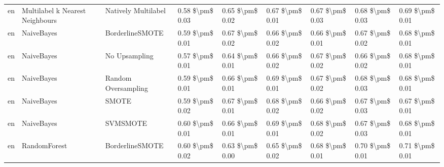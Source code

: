 \begin{tabular}{lllllllll}
      en & Multilabel k Nearest Neighbours &           Natively Multilabel & 0.58 \$\textbackslash pm\$ 0.03 &           0.65 \$\textbackslash pm\$ 0.02 &       0.67 \$\textbackslash pm\$ 0.01 &        0.67 \$\textbackslash pm\$ 0.03 &                         0.68 \$\textbackslash pm\$ 0.03 &     0.69 \$\textbackslash pm\$ 0.01 \\
      en &                      NaiveBayes &               BorderlineSMOTE & 0.59 \$\textbackslash pm\$ 0.01 &           0.67 \$\textbackslash pm\$ 0.02 &       0.66 \$\textbackslash pm\$ 0.02 &        0.66 \$\textbackslash pm\$ 0.01 &                         0.67 \$\textbackslash pm\$ 0.02 &     0.68 \$\textbackslash pm\$ 0.01 \\
      en &                      NaiveBayes &                 No Upsampling & 0.57 \$\textbackslash pm\$ 0.01 &           0.64 \$\textbackslash pm\$ 0.01 &       0.66 \$\textbackslash pm\$ 0.02 &        0.67 \$\textbackslash pm\$ 0.02 &                         0.66 \$\textbackslash pm\$ 0.02 &     0.68 \$\textbackslash pm\$ 0.01 \\
      en &                      NaiveBayes &           Random Oversampling & 0.59 \$\textbackslash pm\$ 0.01 &           0.66 \$\textbackslash pm\$ 0.01 &       0.69 \$\textbackslash pm\$ 0.01 &        0.67 \$\textbackslash pm\$ 0.02 &                         0.68 \$\textbackslash pm\$ 0.03 &     0.68 \$\textbackslash pm\$ 0.01 \\
      en &                      NaiveBayes &                         SMOTE & 0.59 \$\textbackslash pm\$ 0.02 &           0.67 \$\textbackslash pm\$ 0.01 &       0.68 \$\textbackslash pm\$ 0.02 &        0.66 \$\textbackslash pm\$ 0.02 &                         0.67 \$\textbackslash pm\$ 0.03 &     0.67 \$\textbackslash pm\$ 0.01 \\
      en &                      NaiveBayes &                      SVMSMOTE & 0.60 \$\textbackslash pm\$ 0.01 &           0.66 \$\textbackslash pm\$ 0.01 &       0.69 \$\textbackslash pm\$ 0.01 &        0.68 \$\textbackslash pm\$ 0.02 &                         0.67 \$\textbackslash pm\$ 0.03 &     0.68 \$\textbackslash pm\$ 0.01 \\
      en &                    RandomForest &               BorderlineSMOTE & 0.60 \$\textbackslash pm\$ 0.02 &           0.63 \$\textbackslash pm\$ 0.00 &       0.65 \$\textbackslash pm\$ 0.02 &        0.68 \$\textbackslash pm\$ 0.01 &                         0.70 \$\textbackslash pm\$ 0.01 &     0.71 \$\textbackslash pm\$ 0.01 \\

\end{tabular}
